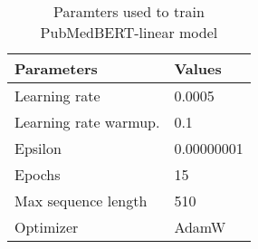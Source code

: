 \documentclass[10.7pt,]{article}
\begin{document}
%
\begin{table}[ht]
\centering
\begin{tabular}{|l|l|}
\hline
Parameters               & Values                            \\
\hline
Learning rate           & 0.0005                             \\
Learning rate warmup.   & 0.1                               \\
Epsilon                 & 0.00000001                         \\
Epochs                  & 15                                 \\
Max sequence length     & 510                                \\
Optimizer               & AdamW                              \\
\hline
\end{tabular}
\caption{\label{ws:params} Paramters used to train PubMedBERT-linear model}
\end{table}
%
%
%
%
%
\end{document}
